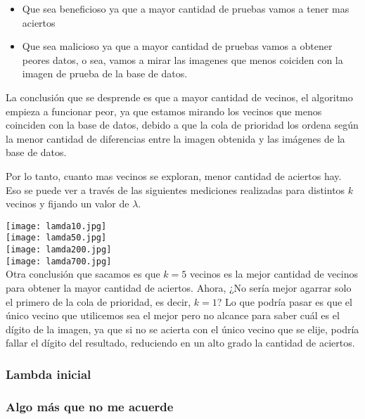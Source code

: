 \begin{itemize}
  \item Que sea beneficioso ya que a mayor cantidad de pruebas vamos a tener mas aciertos
  \item Que sea malicioso ya que a mayor cantidad de pruebas vamos a obtener peores datos, o sea, vamos a mirar las imagenes que menos coiciden con la imagen de prueba de la base de datos.
\end{itemize}

La conclusión que se desprende es que a mayor cantidad de vecinos, el algoritmo empieza a funcionar peor, ya que estamos mirando los vecinos que menos coinciden con la base de datos, debido a que la cola de prioridad los ordena según la menor cantidad de diferencias entre la imagen obtenida y las imágenes de la base de datos. 

Por lo tanto, cuanto mas vecinos se exploran, menor cantidad de aciertos hay. Eso se puede ver a través de las siguientes mediciones realizadas para distintos $k$ vecinos y fijando un valor de $\lambda$.

\texttt{[image: lamda10.jpg]}\\
\texttt{[image: lamda50.jpg]}\\
\texttt{[image: lamda200.jpg]}\\
\texttt{[image: lamda700.jpg]}\\


Otra conclusión que sacamos es que $k = 5$ vecinos es la mejor cantidad de vecinos para obtener la mayor cantidad de aciertos. 
Ahora, ¿No sería mejor agarrar solo el primero de la cola de prioridad, es decir, $k = 1$? 
Lo que podría pasar es que el único vecino que utilicemos sea el mejor pero no alcance para saber cuál es el dígito de la imagen, ya que si no se acierta con el único vecino que se elije,  podría fallar el dígito del resultado, reduciendo en un alto grado la cantidad de aciertos.

\subsubsection{Lambda inicial}

\subsubsection{Algo más que no me acuerde}
